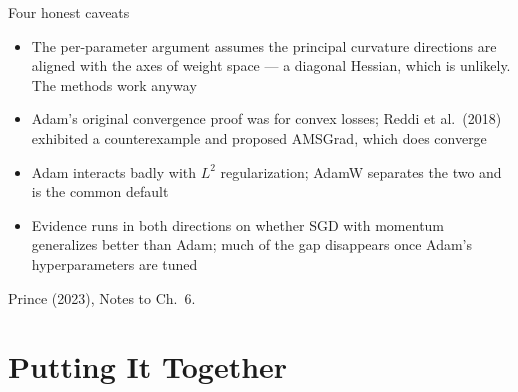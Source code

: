 \documentclass[aspectratio=169, 11pt]{beamer}
\newcommand{\srcline}[1]{%
  \par\vspace{0.25em}%
  {\scriptsize\color{mcMuted}\hfill #1\par}}
\newcommand{\figcap}[2][0.90]{%
  \begin{center}\begin{minipage}{#1\textwidth}\centering
    {\scriptsize\color{mcMuted} #2}
  \end{minipage}\end{center}}
\newcommand{\src}[3]{}      %
\begin{document}

\begin{frame}{Four honest caveats}
  \src{prince2023}{page}{93-94}
  \src{bishop2024}{section}{7.3.3}
  \src{reddi2018}{section}{3}
  \src{reddi2018}{section}{4}
  \src{loshchilov2019}{algorithm}{2}
  \src{loshchilov2019}{section}{2}
  \begin{itemize}\itemsep0.3em
    \item The per-parameter argument assumes the principal curvature
          directions are \alert{aligned with the axes} of weight space
          --- a diagonal Hessian, which is unlikely. The methods work
          anyway
    \item Adam's original convergence proof was for convex losses;
          Reddi et al.~(2018) exhibited a counterexample and proposed
          AMSGrad, which does converge
    \item Adam interacts badly with $L^2$ regularization; AdamW
          separates the two and is the common default
    \item Evidence runs in both directions on whether SGD with momentum
          generalizes better than Adam; much of the gap disappears once
          Adam's hyperparameters are tuned
  \end{itemize}
  \srcline{Prince (2023), Notes to Ch.~6.}
\end{frame}

\section{Putting It Together}
\end{document}
